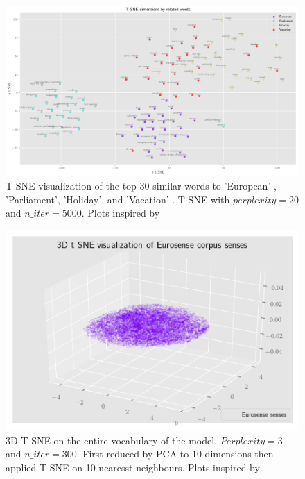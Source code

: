 \documentclass[12pt,a4paper]{article}
\begin{document}
\begin{figure}[h]
\begin{center}
\includegraphics[width=\columnwidth, angle = 0]{img/tsne2D.pdf}
\end{center}
\caption{T-SNE visualization of the top 30 similar words to 'European' , 'Parliament', 'Holiday', and 'Vacation' . T-SNE with $perplexity = 20$ and $n\_iter = 5000$. Plots inspired by \cite{tsne}}
\label{img:tsne2D}
\end{figure}

\begin{figure}[H]
\begin{center}
\includegraphics[width=0.5\columnwidth, angle = 0]{img/tsne3D.png}
\end{center}
\caption{3D T-SNE on the entire vocabulary of the model. $Perplexity = 3$ and $n\_iter = 300$. First reduced by PCA to 10 dimensions then applied T-SNE on 10 nearesst neighbours. Plots inspired by \cite{tsne}}
\label{img:tsne3D}
\end{figure}
\end{document}
